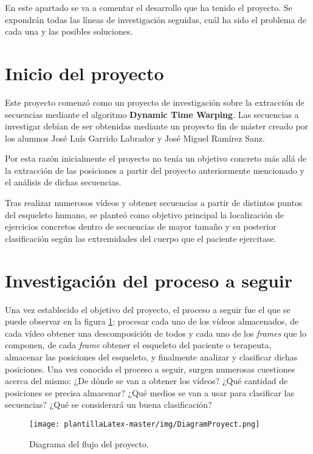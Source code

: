 
En este apartado se va a comentar el desarrollo que ha tenido el proyecto. Se expondrán todas las líneas de investigación seguidas, cuál ha sido el problema de cada una y las posibles soluciones.

\section{Inicio del proyecto}

Este proyecto comenzó como un proyecto de investigación sobre la extracción de secuencias mediante el algoritmo \textbf{Dynamic Time Warping}. Las secuencias a investigar debían de ser obtenidas mediante un proyecto fin de máster creado por los alumnos José Luís Garrido Labrador y José Miguel Ramírez Sanz. 

Por esta razón inicialmente el proyecto no tenía un objetivo concreto más allá de la extracción de las posiciones a partir del proyecto anteriormente mencionado y el análisis de dichas secuencias. 

Tras realizar numerosos vídeos y obtener secuencias a partir de distintos puntos del esqueleto humano, se planteó como objetivo principal la localización de ejercicios concretos dentro de secuencias de mayor tamaño y su posterior clasificación según las extremidades del cuerpo que el paciente ejercitase.  

\section{Investigación del proceso a seguir}

Una vez establecido el objetivo del proyecto, el proceso a seguir fue el que se puede observar en la figura \ref{fig:diagramP}: procesar cada uno de los vídeos almacenados, de cada vídeo obtener una descomposición de todos y cada uno de los \textit{frames} que lo componen, de cada \textit{frame} obtener el esqueleto del paciente o terapeuta, almacenar las posiciones del esqueleto, y finalmente analizar y clasificar dichas posiciones. Una vez conocido el proceso a seguir, surgen numerosas cuestiones acerca del mismo: ¿De dónde se van a obtener los vídeos? ¿Qué cantidad de posiciones se precisa almacenar? ¿Qué medios se van a usar para clasificar las secuencias? ¿Qué se considerará un buena clasificación?

\begin{figure}[H]
    \centering
    \texttt{[image: plantillaLatex-master/img/DiagramProyect.png]}
    \caption{Diagrama del flujo del proyecto.}
    \label{fig:diagramP}
\end{figure}

